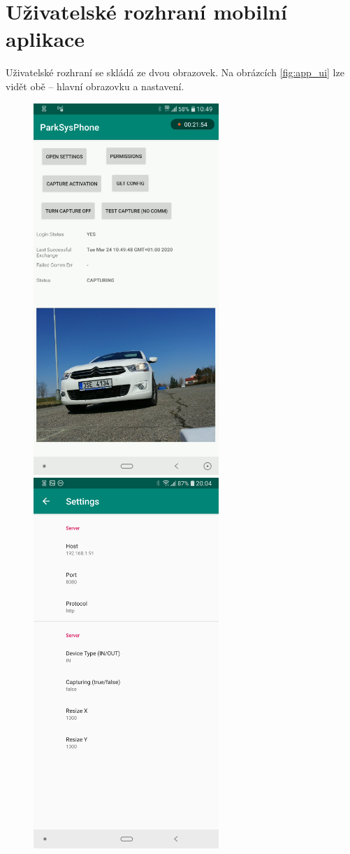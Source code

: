 \section{Uživatelské rozhraní mobilní aplikace}

\noindent
Uživatelské rozhraní se skládá ze dvou obrazovek. Na obrázcích \ref{fig:app_ui}
lze vidět obě -- hlavní obrazovku a nastavení.

\begin{figure}[!htb] \centering
  \includegraphics[width=70mm]{../img/app_mainscreen.png}
  \includegraphics[width=70mm]{../img/app_settings.png}

\end{figure}
